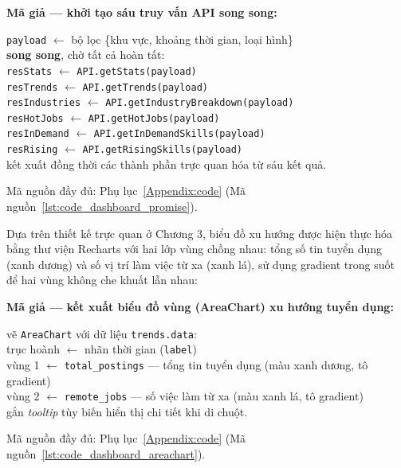 \vspace{1mm}
\noindent\textbf{Mã giả --- khởi tạo sáu truy vấn API song song:}
\begin{flushleft}
\small\setlength{\parindent}{0pt}
\texttt{payload} $\leftarrow$ bộ lọc \{khu vực, khoảng thời gian, loại hình\} \\
\textbf{song song}, chờ tất cả hoàn tất: \\
\hspace*{1.5em}\texttt{resStats} $\leftarrow$ \texttt{API.getStats(payload)} \\
\hspace*{1.5em}\texttt{resTrends} $\leftarrow$ \texttt{API.getTrends(payload)} \\
\hspace*{1.5em}\texttt{resIndustries} $\leftarrow$ \texttt{API.getIndustryBreakdown(payload)} \\
\hspace*{1.5em}\texttt{resHotJobs} $\leftarrow$ \texttt{API.getHotJobs(payload)} \\
\hspace*{1.5em}\texttt{resInDemand} $\leftarrow$ \texttt{API.getInDemandSkills(payload)} \\
\hspace*{1.5em}\texttt{resRising} $\leftarrow$ \texttt{API.getRisingSkills(payload)} \\
kết xuất đồng thời các thành phần trực quan hóa từ sáu kết quả.
\end{flushleft}
\noindent Mã nguồn đầy đủ: Phụ lục~\ref{Appendix:code} (Mã nguồn~\ref{lst:code_dashboard_promise}).

Dựa trên thiết kế trực quan ở Chương 3, biểu đồ xu hướng được hiện thực hóa bằng thư viện Recharts với hai lớp vùng chồng nhau: tổng số tin tuyển dụng (xanh dương) và số vị trí làm việc từ xa (xanh lá), sử dụng gradient trong suốt để hai vùng không che khuất lẫn nhau:

\vspace{1mm}
\noindent\textbf{Mã giả --- kết xuất biểu đồ vùng (AreaChart) xu hướng tuyển dụng:}
\begin{flushleft}
\small\setlength{\parindent}{0pt}
vẽ \texttt{AreaChart} với dữ liệu \texttt{trends.data}: \\
\hspace*{1.5em}trục hoành $\leftarrow$ nhãn thời gian (\texttt{label}) \\
\hspace*{1.5em}vùng 1 $\leftarrow$ \texttt{total\_postings} --- tổng tin tuyển dụng (màu xanh dương, tô gradient) \\
\hspace*{1.5em}vùng 2 $\leftarrow$ \texttt{remote\_jobs} --- số việc làm từ xa (màu xanh lá, tô gradient) \\
\hspace*{1.5em}gắn \textit{tooltip} tùy biến hiển thị chi tiết khi di chuột.
\end{flushleft}
\noindent Mã nguồn đầy đủ: Phụ lục~\ref{Appendix:code} (Mã nguồn~\ref{lst:code_dashboard_areachart}).

